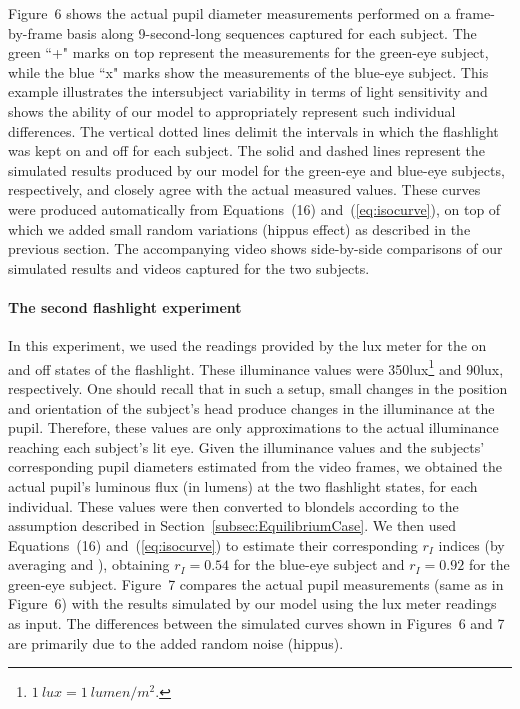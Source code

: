 \documentclass{acmtog}
\begin{document}
Figure~6 shows the actual pupil diameter measurements performed on a 
frame-by-frame basis along 9-second-long sequences captured for each subject. 
The green ``+" marks on top represent the measurements for the green-eye subject, while the blue ``x" marks show the
measurements of the blue-eye subject.  This example illustrates the intersubject variability in terms of light
sensitivity and shows the ability of our model to appropriately represent such individual differences.  The vertical
dotted lines delimit the intervals in which the flashlight was kept on and off for each subject. 
The solid and dashed lines represent the simulated results produced by our model for the green-eye and blue-eye subjects, respectively, and
closely agree with the actual measured values.
 These curves were produced automatically from Equations~(16) and~(\ref{eq:isocurve}), on top of which we added small random variations (hippus effect) as described in the previous section. 
The accompanying video shows side-by-side comparisons of our simulated results and videos captured for the two subjects.
 
\paragraph{The second flashlight experiment}
In this experiment, we used the readings provided by the lux meter for the {on} and {off} states of the flashlight. These
illuminance values were 350lux\footnote{$1~{{lux}} = 1~{{lumen}} /m^2$.} and 90lux, respectively. One should recall that in such
a setup, small changes in the position and orientation of the subject's head produce changes in the illuminance at the
pupil. Therefore, these values are only approximations to the actual illuminance reaching each subject's lit eye.    Given
the illuminance values and the subjects' corresponding pupil diameters estimated from the video frames, we obtained the
actual pupil's luminous flux (in lumens) at the two flashlight states, for each individual. These values were then
converted to blondels according to the assumption described in Section~\ref{subsec:EquilibriumCase}. We then used
Equations~(16) and~(\ref{eq:isocurve}) to estimate their corresponding $r_I$ indices (by averaging
 and ), obtaining $r_I = 0.54$ for the blue-eye subject and $r_I =
0.92$ for the green-eye subject.  Figure~7 compares the actual pupil
measurements  (same as in Figure~6) with the results simulated by our model
using the lux meter readings as input. The differences between the simulated curves shown in
Figures~6 and
7 are primarily due to the added random noise (hippus).
\end{document}
